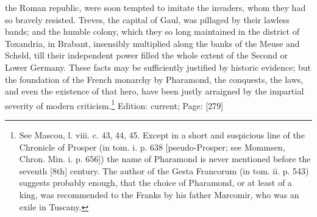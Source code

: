 the Roman republic, were soon tempted to imitate the invaders, whom they had so bravely resisted. Treves, the capital of Gaul, was pillaged by their lawless bands; and the humble colony, which they so long maintained in the district of Toxandria, in Brabant, insensibly multiplied along the banks of the Meuse and Scheld, till their independent power filled the whole extent of the Second or Lower Germany. These facts may be sufficiently justified by historic evidence; but the foundation of the French monarchy by Pharamond, the conquests, the laws, and even the existence of that hero, have been justly arraigned by the impartial severity of modern criticism.\footnote{See Mascou, l. viii. c. 43, 44, 45. Except in a short and suspicious line of the Chronicle of Prosper (in tom. i. p. 638 [pseudo-Prosper; see Mommsen, Chron. Min. i. p. 656]) the name of Pharamond is never mentioned before the seventh [8th] century. The author of the Gesta Francorum (in tom. ii. p. 543) suggests probably enough, that the choice of Pharamond, or at least of a king, was recommended to the Franks by his father Marcomir, who was an exile in Tuscany.}
Edition: current; Page: [279]

